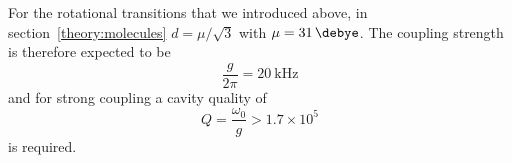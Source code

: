For the rotational \CaF{} transitions that we introduced above, in
section~\ref{theory:molecules} $d = \mu/\sqrt{3}$ with $\mu =
\SI{31}{\debye}$.
%
The coupling strength is therefore expected to be
%
\begin{equation}
  \frac{g}{2\pi} = \SI{20}{\kilo\hertz}
\end{equation}
%
and for strong coupling a cavity quality of
%
\begin{equation}
  Q = \frac{\omega_0}{g} > 1.7 \times 10^5
\end{equation}
%
is required.
